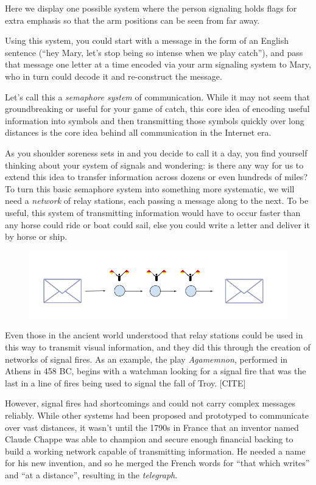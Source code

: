 \documentclass[UTF8]{book}
\begin{document}
\begin{CJK}{UTF8}{gbsn}
Here we display one possible system where the person signaling holds flags for extra emphasis so that the arm positions can be seen from far away.

Using this system, you could start with a message in the form of an English sentence (``hey Mary, let's stop being so intense when we play catch''), and pass that message one letter at a time encoded via your arm signaling system to Mary, who in turn could decode it and re-construct the message.

Let's call this a \emph{semaphore system} of communication. While it may not seem that groundbreaking or useful for your game of catch, this core idea of encoding useful information into symbols and then transmitting those symbols quickly over long distances is the core idea behind all communication in the Internet era.

As you shoulder soreness sets in and you decide to call it a day, you find yourself thinking about your system of signals and wondering: is there any way for us to extend this idea to transfer information across dozens or even hundreds of miles? To turn this basic semaphore system into something more systematic, we will need a \emph{network} of relay stations, each passing a message along to the next. To be useful, this system of transmitting information would have to occur faster than any horse could ride or boat could sail, else you could write a letter and deliver it by horse or ship.

\begin{figure}[H]
\centering
\includegraphics[width=0.9\linewidth]{relay_stations}
\end{figure}

Even those in the ancient world understood that relay stations could be used in this way to transmit visual information, and they did this through the creation of networks of signal fires. As an example, the play \emph{Agamemnon}, performed in Athens in 458 BC, begins with a watchman looking for a signal fire that was the last in a line of fires being used to signal the fall of Troy. [CITE]

However, signal fires had shortcomings and could not carry complex messages reliably. While other systems had been proposed and prototyped to communicate over vast distances, it wasn't until the 1790s in France that an inventor named Claude Chappe was able to champion and secure enough financial backing to build a working network capable of transmitting information. He needed a name for his new invention, and so he merged the French words for ``that which writes'' and ``at a distance'', resulting in the \emph{telegraph}.


\end{CJK}
\end{document}
